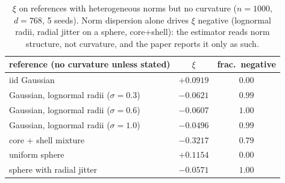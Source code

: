\begin{table}[H]
\centering
\small
\begin{tabular}{lcc}
\toprule
reference (no curvature unless stated) & $\xi$ & frac.\ negative \\
\midrule
iid Gaussian & $+0.0919$ & $0.00$ \\
Gaussian, lognormal radii ($\sigma{=}0.3$) & $-0.0621$ & $0.99$ \\
Gaussian, lognormal radii ($\sigma{=}0.6$) & $-0.0607$ & $1.00$ \\
Gaussian, lognormal radii ($\sigma{=}1.0$) & $-0.0496$ & $0.99$ \\
core + shell mixture & $-0.3217$ & $0.79$ \\
uniform sphere & $+0.1154$ & $0.00$ \\
sphere with radial jitter & $-0.0571$ & $1.00$ \\
\bottomrule
\end{tabular}
\caption{$\xi$ on references with heterogeneous norms but no curvature ($n{=}1000$, $d{=}768$, 5 seeds). Norm dispersion alone drives $\xi$ negative (lognormal radii, radial jitter on a sphere, core+shell): the estimator reads norm structure, not curvature, and the paper reports it only as such.}
\label{tab:b26-xinorm}
\end{table}

